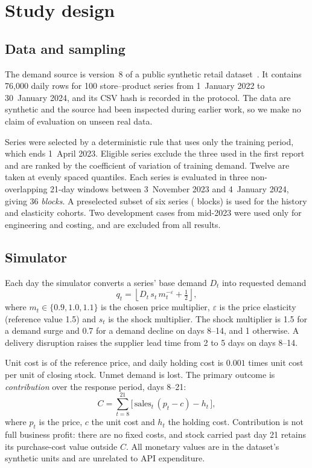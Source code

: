 \documentclass[runningheads]{llncs}
\begin{document}
\section{Study design}\label{sec:design}

\subsection{Data and sampling}

The demand source is version~8 of a public synthetic retail dataset~\cite{kaggle_retail_v8}. It contains 76{,}000 daily rows for 100 store--product series from 1~January 2022 to 30~January 2024, and its CSV hash is recorded in the protocol. The data are synthetic and the source had been inspected during earlier work, so we make no claim of evaluation on unseen real data.

Series were selected by a deterministic rule that uses only the training period, which ends 1~April 2023. Eligible series exclude the three used in the first report and are ranked by the coefficient of variation of training demand. Twelve are taken at evenly spaced quantiles. Each series is evaluated in three non-overlapping 21-day windows between 3~November 2023 and 4~January 2024, giving 36 \emph{blocks}. A preselected subset of six series ( blocks) is used for the history and elasticity cohorts. Two development cases from mid-2023 were used only for engineering and costing, and are excluded from all results.

\subsection{Simulator}

Each day the simulator converts a series' base demand $D_t$ into requested demand
\begin{equation}
q_t = \left\lfloor D_t \, s_t \, m_t^{-\varepsilon} + \tfrac12 \right\rfloor,
\end{equation}
where $m_t \in \{0.9, 1.0, 1.1\}$ is the chosen price multiplier, $\varepsilon$ is the price elasticity (reference value 1.5) and $s_t$ is the shock multiplier. The shock multiplier is 1.5 for a demand surge and 0.7 for a demand decline on days 8--14, and 1 otherwise. A delivery disruption raises the supplier lead time from 2 to 5 days on days 8--14.

Unit cost is  of the reference price, and daily holding cost is $0.001$ times unit cost per unit of closing stock. Unmet demand is lost. The primary outcome is \emph{contribution} over the response period, days 8--21:
\begin{equation}
C = \sum_{t=8}^{21} \bigl[\, \text{sales}_t\,(p_t - c) - h_t \,\bigr],
\end{equation}
where $p_t$ is the price, $c$ the unit cost and $h_t$ the holding cost. Contribution is not full business profit: there are no fixed costs, and stock carried past day 21 retains its purchase-cost value outside $C$. All monetary values are in the dataset's synthetic units and are unrelated to API expenditure.
\end{document}
